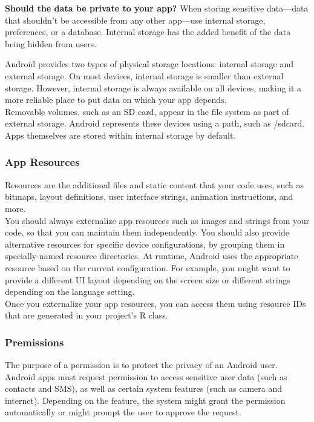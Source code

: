 \documentclass[14pt]{report}
\begin{document}
					\textbf{Should the data be private to your app?} When storing sensitive data—data that shouldn't be accessible from any other app—use internal storage, preferences, or a database. Internal storage has the added benefit of the data being hidden from users.\newline \newline

					Android provides two types of physical storage locations: internal storage and external storage. On most devices, internal storage is smaller than external storage. However, internal storage is always available on all devices, making it a more reliable place to put data on which your app depends.\\
					
					Removable volumes, such as an SD card, appear in the file system as part of external storage. Android represents these devices using a path, such as /sdcard. Apps themselves are stored within internal storage by default.			
				
				\subsubsection{App Resources}
					Resources are the additional files and static content that your code uses, such as bitmaps, layout definitions, user interface strings, animation instructions, and more.\\

					You should always externalize app resources such as images and strings from your code, so that you can maintain them independently. You should also provide alternative resources for specific device configurations, by grouping them in specially-named resource directories. At runtime, Android uses the appropriate resource based on the current configuration. For example, you might want to provide a different UI layout depending on the screen size or different strings depending on the language setting.\\
					
					Once you externalize your app resources, you can access them using resource IDs that are generated in your project's R class.

				\subsubsection{Premissions}
					The purpose of a permission is to protect the privacy of an Android user. Android apps must request permission to access sensitive user data (such as contacts and SMS), as well as certain system features (such as camera and internet). Depending on the feature, the system might grant the permission automatically or might prompt the user to approve the request.\\
\end{document}
